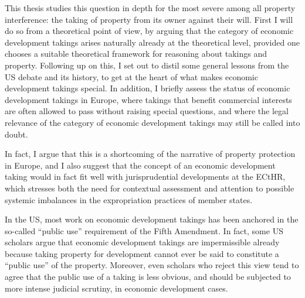 {%
This thesis studies this question in depth for the most severe among all property interference: the taking of property from its owner against their will.} First I will do so from a theoretical point of view, by arguing that the category of economic development takings arises naturally already at the theoretical level, provided one chooses a suitable theoretical framework for reasoning about takings and property. Following up on this, I set out to distil some general lessons from the US debate and its history, to get at the heart of what makes economic development takings special. In addition, I briefly assess the status of economic development takings in Europe, where takings that benefit commercial interests are often allowed to pass without raising special questions, and where the legal relevance of the category of economic development takings may still be called into doubt.

In fact, I argue that this is a shortcoming of the narrative of property protection in Europe, and I also suggest that the concept of an economic development taking would in fact fit well with jurisprudential developments at the ECtHR, which stresses both the need for contextual assessment and attention to possible systemic imbalances in the expropriation practices of member states.


In the US, most work on economic development takings has been anchored in the so-called ``public use'' requirement of the Fifth Amendment. In fact, some US scholars argue that economic development takings are impermissible already because taking property for development cannot ever be said to constitute a ``public use'' of the property. Moreover, even scholars who reject this view tend to agree that the public use of a taking is less obvious, and should be subjected to more intense judicial scrutiny, in economic development cases.

